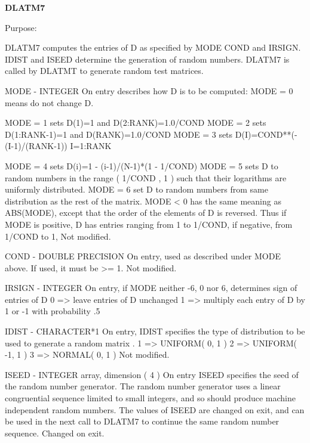 {\bfseries D\+L\+A\+T\+M7} 

\begin{DoxyParagraph}{Purpose\+: }
\begin{DoxyVerb}    DLATM7 computes the entries of D as specified by MODE
    COND and IRSIGN. IDIST and ISEED determine the generation
    of random numbers. DLATM7 is called by DLATMT to generate
    random test matrices.\end{DoxyVerb}
 \begin{DoxyVerb}  MODE   - INTEGER
           On entry describes how D is to be computed:
           MODE = 0 means do not change D.

           MODE = 1 sets D(1)=1 and D(2:RANK)=1.0/COND
           MODE = 2 sets D(1:RANK-1)=1 and D(RANK)=1.0/COND
           MODE = 3 sets D(I)=COND**(-(I-1)/(RANK-1)) I=1:RANK

           MODE = 4 sets D(i)=1 - (i-1)/(N-1)*(1 - 1/COND)
           MODE = 5 sets D to random numbers in the range
                    ( 1/COND , 1 ) such that their logarithms
                    are uniformly distributed.
           MODE = 6 set D to random numbers from same distribution
                    as the rest of the matrix.
           MODE < 0 has the same meaning as ABS(MODE), except that
              the order of the elements of D is reversed.
           Thus if MODE is positive, D has entries ranging from
              1 to 1/COND, if negative, from 1/COND to 1,
           Not modified.

  COND   - DOUBLE PRECISION
           On entry, used as described under MODE above.
           If used, it must be >= 1. Not modified.

  IRSIGN - INTEGER
           On entry, if MODE neither -6, 0 nor 6, determines sign of
           entries of D
           0 => leave entries of D unchanged
           1 => multiply each entry of D by 1 or -1 with probability .5

  IDIST  - CHARACTER*1
           On entry, IDIST specifies the type of distribution to be
           used to generate a random matrix .
           1 => UNIFORM( 0, 1 )
           2 => UNIFORM( -1, 1 )
           3 => NORMAL( 0, 1 )
           Not modified.

  ISEED  - INTEGER array, dimension ( 4 )
           On entry ISEED specifies the seed of the random number
           generator. The random number generator uses a
           linear congruential sequence limited to small
           integers, and so should produce machine independent
           random numbers. The values of ISEED are changed on
           exit, and can be used in the next call to DLATM7
           to continue the same random number sequence.
           Changed on exit.


\end{DoxyVerb}
\end{DoxyParagraph}
